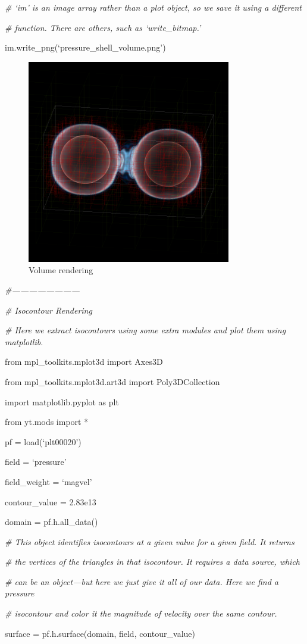 {\it\# `im' is an image array rather than a plot object, so we save it using a different}
{\setlength{\parskip}{0pt}

{\it\# function. There are others, such as `write\_bitmap.'}

im.write\_png(`pressure\_shell\_volume.png')
}
\begin{figure}[h]
\centering
\includegraphics[width=3.5in]{volume}
\caption{Volume rendering}
\end{figure}


{\it\#------------------------}

{\it\# Isocontour Rendering}
{\setlength{\parskip}{0pt}

{\it\# Here we extract isocontours using some extra modules and plot them using matplotlib.}

from mpl\_toolkits.mplot3d import Axes3D
}

from mpl\_toolkits.mplot3d.art3d import Poly3DCollection

import matplotlib.pyplot as plt

from yt.mods import *

pf = load(`plt00020')

field = `pressure'

field\_weight = `magvel'

contour\_value = 2.83e13

domain = pf.h.all\_data()

{\it\# This object identifies isocontours at a given value for a given field. It returns}
{\setlength{\parskip}{0pt}

{\it\# the vertices of the triangles in that isocontour. It requires a data source, which}

{\it\# can be an object---but here we just give it all of our data. Here we find a pressure}

{\it\# isocontour and color it the magnitude of velocity over the same contour.}

surface = pf.h.surface(domain, field, contour\_value)
}

